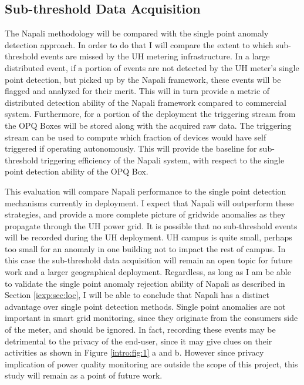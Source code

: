 \subsection{Sub-threshold Data Acquisition} \label{iexp:sec:sub}
The Napali methodology will be compared with the single point anomaly detection approach. In order to do that I will compare the extent to which sub-threshold events are missed by the UH metering infrastructure. In a large distributed event, if a portion of events are not detected by the UH meter's single point detection, but picked up by the Napali framework, these events will be flagged and analyzed for their merit. This will in turn provide a metric of distributed detection ability of the Napali framework compared to commercial system. Furthermore, for a portion of the deployment the triggering stream from the OPQ Boxes will be stored along with the acquired raw data. The triggering stream can be used to compute which fraction of devices would have self triggered if operating autonomously. This will provide the baseline for sub-threshold triggering efficiency of the Napali system, with respect to the single point detection ability of the OPQ Box.

This evaluation will compare Napali performance to the single point detection mechanisms currently in deployment. I expect that Napali will outperform these strategies, and provide a more complete picture of gridwide anomalies as they propagate through the UH power grid. It is possible that no sub-threshold events will be recorded during the UH deployment. UH campus is quite small, perhaps too small for an anomaly in one building not to impact the rest of campus. In this case the sub-threshold data acquisition will remain an open topic for future work and a larger geographical deployment. Regardless, as long as I am be able to validate the single point anomaly rejection ability of Napali as described in Section \ref{iexp:sec:loc}, I will be able to conclude that Napali has a distinct advantage over single point detection methods. Single point anomalies are not important in smart grid monitoring, since they originate from the consumers side of the meter, and should be ignored. In fact, recording these events may be detrimental to the privacy of the end-user, since it may give clues on their activities as shown in Figure \ref{intro:fig:1} a and b. However since privacy implication of power quality monitoring are outside the scope of this project, this study will remain as a point of future work.


